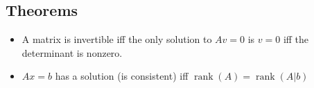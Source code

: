 \documentclass[tbtags,columns=2]{cheatsheet}
\begin{document}
\subsection{Theorems}
\begin{itemize}
    \item A matrix is invertible iff the only solution to $Av = 0$ is $v=0$ iff the determinant is nonzero.
    \item $Ax = b$ has a solution (is consistent) iff $\operatorname{rank}(A)=\operatorname{rank}(A|b)$
\end{itemize}
\end{document}
